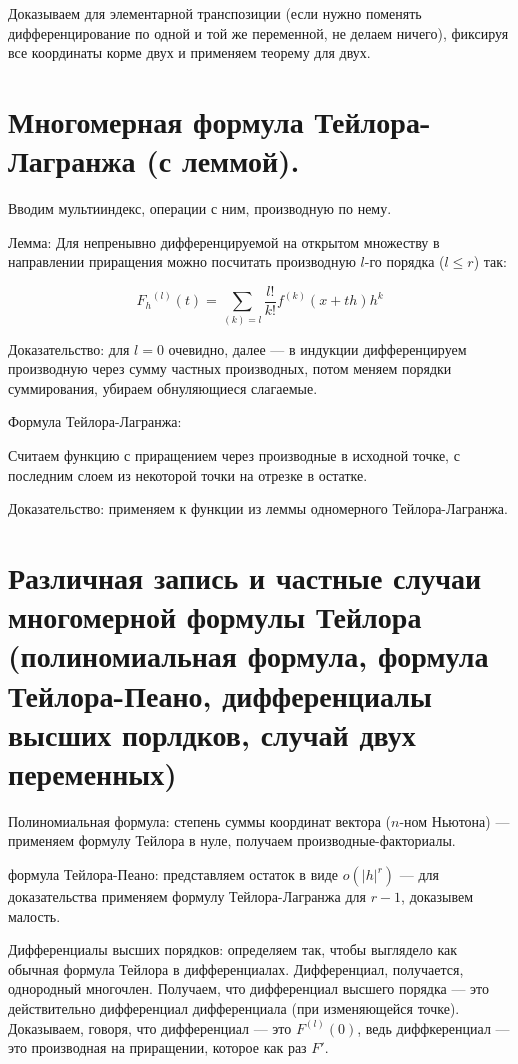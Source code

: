 \documentclass[12pt, a4paper]{article}
\begin{document}
    Доказываем для элементарной транспозиции (если нужно поменять дифференцирование по одной и той же переменной, не делаем ничего), 
    фиксируя все координаты корме двух и применяем теорему для двух.

\section{Многомерная формула Тейлора-Лагранжа (с леммой).}

    Вводим мультииндекс, операции с ним, производную по нему.

    Лемма: Для непренывно дифференцируемой на открытом множеству в направлении приращения можно посчитать
    производную $l$-го порядка ($l \leqslant r$) так:

    \begin{equation}
        {F_h}^{(l)}(t) = \sum_{(k) = l} \frac{l!}{k!} f^{(k)} (x + th) h^k
    \end{equation}


    Доказательство: для $l = 0$ очевидно, далее — 
    в индукции дифференцируем производную через сумму частных производных, 
    потом меняем порядки суммирования, убираем обнуляющиеся слагаемые.


    Формула Тейлора-Лагранжа:

    Считаем функцию с приращением через производные в исходной точке, 
    с последним слоем из некоторой точки на отрезке в остатке.

    Доказательство: применяем к функции из леммы одномерного Тейлора-Лагранжа.

\section{Различная запись и частные случаи многомерной формулы Тейлора (полиномиальная формула, формула Тейлора-Пеано, дифференциалы высших порлдков, случай двух переменных)}

Полиномиальная формула: степень суммы координат вектора ($n$-ном Ньютона) — применяем формулу Тейлора в нуле, получаем производные-факториалы.

формула Тейлора-Пеано: представляем остаток в виде $o(|h|^r)$ — для доказательства применяем формулу Тейлора-Лагранжа для $r-1$, доказывем малость.

Дифференциалы высших порядков: определяем так, чтобы выглядело как обычная формула Тейлора в дифференциалах. Дифференциал, получается, однородный многочлен.
Получаем, что дифференциал высшего порядка — это действительно дифференциал дифференциала (при изменяющейся точке). 
Доказываем, говоря, что дифференциал — это $F^{(l)}(0)$, ведь диффкеренциал — это производная на приращении, которое как раз $F'$.
\end{document}
